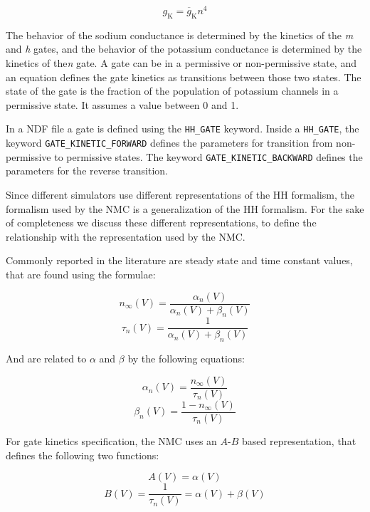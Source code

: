\documentclass[12pt]{article}
\begin{document}
\begin{equation}
  \label{eq:g-k}
  g_{\mathrm{K}} = \overline{g}_{\mathrm{K}}n^4
\end{equation}

The behavior of the sodium conductance is determined by the kinetics
of the {\it m} and {\it h} gates, and the behavior of the potassium
conductance is determined by the kinetics of the{\it n} gate.  A gate can
be in a permissive or non-permissive state, and an equation defines
the gate kinetics as transitions between those two states.  The state
of the gate is the fraction of the population of potassium channels in
a permissive state.  It assumes a value between 0 and 1.

In a NDF file a gate is defined using the {\tt HH\_GATE} keyword.
Inside a {\tt HH\_GATE}, the keyword {\tt GATE\_KINETIC\_FORWARD}
defines the parameters for transition from non-permissive to
permissive states.  The keyword {\tt GATE\_KINETIC\_BACKWARD} defines the
parameters for the reverse transition.

Since different simulators use different representations of the HH
formalism, the formalism used by the NMC is a generalization of the HH
formalism.  For the sake of completeness we discuss these different
representations, to define the relationship with the representation
used by the NMC.

Commonly reported in the literature are steady state and time constant
values, that are found using the formulae:

\begin{equation}
  n_\infty(V) = \frac{ \alpha_n(V) }{ \alpha_n(V) + \beta_n(V) }
\end{equation}
\begin{equation}
  \tau_n(V) = \frac{ 1 }{ \alpha_n(V) + \beta_n(V) }
\end{equation}

And are related to $\alpha$ and $\beta$ by the following equations:

\begin{equation}
  \alpha_n(V) = \frac{ n_\infty(V) }{ \tau_n(V) }
\end{equation}
\begin{equation}
  \beta_n(V) = \frac{ 1 - n_\infty(V) }{ \tau_n(V) }
\end{equation}

For gate kinetics specification, the NMC uses an $A$-$B$ based
representation, that defines the following two functions:

\begin{equation}
  A(V) = \alpha(V)
\end{equation}
\begin{equation}
  B(V) = \frac{ 1 }{ \tau_n(V) } = \alpha(V) + \beta(V)
\end{equation}
\end{document}

